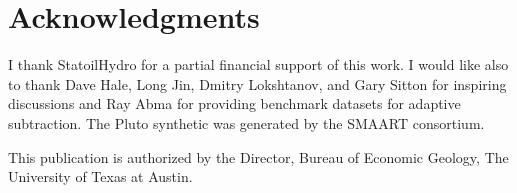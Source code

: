 \section{Acknowledgments}

I thank StatoilHydro for a partial financial support of this work. I
would like also to thank Dave Hale, Long Jin, Dmitry Lokshtanov, and
Gary Sitton for inspiring discussions and Ray Abma for providing
benchmark datasets for adaptive subtraction. The Pluto synthetic was
generated by the SMAART consortium.

This publication is authorized by the Director, Bureau of Economic
Geology, The University of Texas at Austin.







